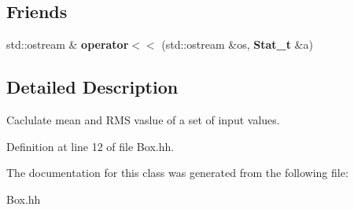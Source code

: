 \subsection*{Friends}
\begin{DoxyCompactItemize}
\item 
std::ostream \& {\bfseries operator$<$$<$} (std::ostream \&os, {\bf Stat\_\-t} \&a)\label{classCALICE_1_1Stat__t_a33122c0e8d33292956fdbf1d86680205}

\end{DoxyCompactItemize}


\subsection{Detailed Description}
Caclulate mean and RMS vaslue of a set of input values. 

Definition at line 12 of file Box.hh.

The documentation for this class was generated from the following file:\begin{DoxyCompactItemize}
\item 
Box.hh\end{DoxyCompactItemize}
